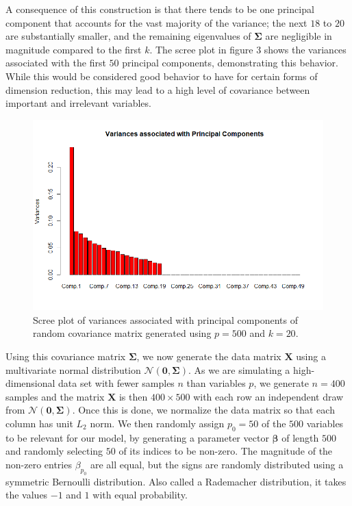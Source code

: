 \documentclass[]{scrartcl}
\newcommand{\1}[1]{\mathbbm{1}_{\left\{#1\right\}}}
\begin{document}
A consequence of this construction is that there tends to be one principal component that accounts for the vast majority of the variance; the next $18$ to $20$ are substantially smaller, and the remaining eigenvalues of $\mathbf{\Sigma}$ are negligible in magnitude compared to the first $k$. The scree plot in figure 3 shows the variances associated with the first $50$ principal components, demonstrating this behavior. While this would be considered good behavior to have for certain forms of dimension reduction, this may lead to a high level of covariance between important and irrelevant variables. 

\begin{figure}[h]
	\centering
	\includegraphics[width=\textwidth]{CovPCVars}
	\caption{Scree plot of variances associated with principal components of random covariance matrix generated using $p = 500$ and $k = 20$.}
\end{figure} 
Using this covariance matrix $\mathbf{\Sigma}$, we now generate the data matrix $\mathbf{X}$ using a multivariate normal distribution $\mathcal{N}(\mathbf{0}, \mathbf{\Sigma})$. As we are simulating a high-dimensional data set with fewer samples $n$ than variables $p$, we generate $n = 400$ samples and the matrix $\mathbf{X}$ is then $400 \times 500$ with each row an independent draw from $\mathcal{N}(\mathbf{0}, \mathbf{\Sigma})$. Once this is done, we normalize the data matrix so that each column has unit $L_{2}$ norm. We then randomly assign $p_{0} = 50$ of the $500$ variables to be relevant for our model, by generating a parameter vector $\pmb{\beta}$ of length $500$ and randomly selecting $50$ of its indices to be non-zero. The magnitude of the non-zero entries $\beta_{p_{0}}$ are all equal, but the signs are randomly distributed using a symmetric Bernoulli distribution. Also called a Rademacher distribution, it takes the values $-1$ and $1$ with equal probability. 
\end{document}
